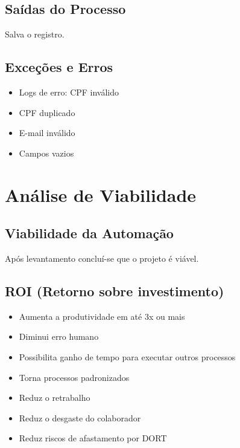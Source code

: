 \documentclass[12pt]{scrreprt}
\begin{document}
\section{Saídas do Processo}
Salva o registro.

\section{Exceções e Erros}
\begin{itemize}
    \item Logs de erro: CPF inválido
    \item CPF duplicado
    \item E-mail inválido
    \item Campos vazios
\end{itemize}

\chapter{Análise de Viabilidade}

\section{Viabilidade da Automação}
Após levantamento concluí-se que o projeto é viável.

\section{ROI (Retorno sobre investimento)}
\begin{itemize}
    \item Aumenta a produtividade em até 3x ou mais
    \item Diminui erro humano
    \item Possibilita ganho de tempo para executar outros processos
    \item Torna processos padronizados
    \item Reduz o retrabalho
    \item Reduz o desgaste do colaborador
    \item Reduz riscos de afastamento por DORT
\end{itemize}
\end{document}

